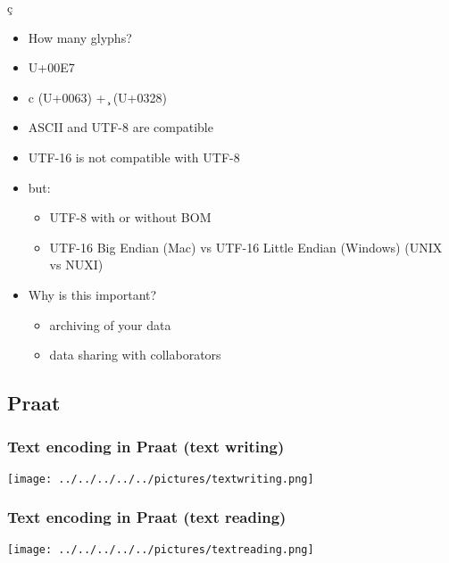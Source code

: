 \documentclass[12pt,a4paper]{beamer}
\begin{document}
\begin{frame}
    \begin{center}
        {\LARGE \c{c}}
    \end{center}
    \begin{itemize}
        \item How many glyphs?
        \item U+00E7
        \item c (U+0063) + \c{\quad} (U+0328)
    \end{itemize}

\end{frame}

\begin{frame}
    \begin{itemize}
        \item ASCII and UTF-8 are compatible
        \item UTF-16 is not compatible with UTF-8
        \item but:
        \begin{itemize}
            \item UTF-8 with or without BOM
            \item UTF-16 Big Endian (Mac) vs UTF-16 Little Endian (Windows) (UNIX vs NUXI)
        \end{itemize}
        \item Why is this important?
        \begin{itemize}
            \item archiving of your data
            \item data sharing with collaborators
        \end{itemize}
    \end{itemize}
\end{frame}

\subsection{Praat}
\begin{frame}
    \frametitle{Text encoding in Praat (text writing)}
    \centering
    \texttt{[image: ../../../../../pictures/textwriting.png]} 
\end{frame}

\begin{frame}
    \frametitle{Text encoding in Praat (text reading)}
    \centering
    \texttt{[image: ../../../../../pictures/textreading.png]} 
\end{frame}
\end{document}
